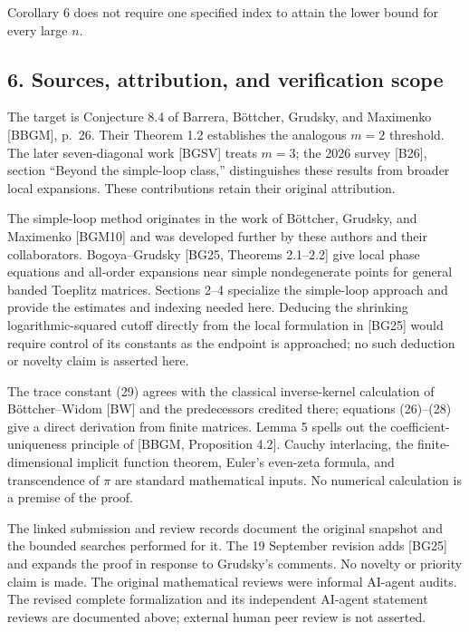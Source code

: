 \documentclass[10pt,a4paper]{article}
\begin{document}
Corollary 6 does not require one specified index to attain the lower bound for every large \(n\).

\subsection{6. Sources, attribution, and verification scope}\label{sources-attribution-and-verification-scope}

The target is Conjecture 8.4 of Barrera, Böttcher, Grudsky, and Maximenko {[}BBGM{]}, p.~26. Their Theorem 1.2 establishes the analogous \(m=2\) threshold. The later seven-diagonal work {[}BGSV{]} treats \(m=3\); the 2026 survey {[}B26{]}, section ``Beyond the simple-loop class,'' distinguishes these results from broader local expansions. These contributions retain their original attribution.

The simple-loop method originates in the work of Böttcher, Grudsky, and Maximenko {[}BGM10{]} and was developed further by these authors and their collaborators. Bogoya--Grudsky {[}BG25, Theorems 2.1--2.2{]} give local phase equations and all-order expansions near simple nondegenerate points for general banded Toeplitz matrices. Sections 2--4 specialize the simple-loop approach and provide the estimates and indexing needed here. Deducing the shrinking logarithmic-squared cutoff directly from the local formulation in {[}BG25{]} would require control of its constants as the endpoint is approached; no such deduction or novelty claim is asserted here.

The trace constant (29) agrees with the classical inverse-kernel calculation of Böttcher--Widom {[}BW{]} and the predecessors credited there; equations (26)--(28) give a direct derivation from finite matrices. Lemma 5 spells out the coefficient-uniqueness principle of {[}BBGM, Proposition 4.2{]}. Cauchy interlacing, the finite-dimensional implicit function theorem, Euler's even-zeta formula, and transcendence of \(\pi\) are standard mathematical inputs. No numerical calculation is a premise of the proof.

The linked submission and review records document the original snapshot and the bounded searches performed for it. The 19 September revision adds {[}BG25{]} and expands the proof in response to Grudsky's comments. No novelty or priority claim is made. The original mathematical reviews were informal AI-agent audits. The revised complete formalization and its independent AI-agent statement reviews are documented above; external human peer review is not asserted.
\end{document}
